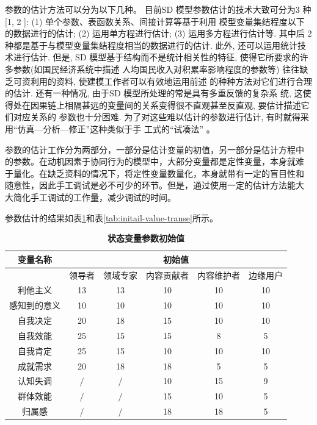 参数的估计方法可以分为以下几种。
目前SD 模型参数估计的技术大致可分为3 种[1, 2 ]: (1) 单个参数、表函数关系、间接计算等基于利用
模型变量集结程度以下的数据进行的估计; (2) 运用单方程进行估计; (3) 运用多方程进行估计等. 其中后
2 种都是基于与模型变量集结程度相当的数据进行的估计. 此外, 还可以运用统计技术进行估计.
但是, SD 模型基于结构而不是统计相关性的特征, 使得它所要求的许多参数(如国民经济系统中描述
人均国民收入对积累率影响程度的参数等) 往往缺乏可资利用的资料, 使建模工作者可以有效地运用前述
的种种方法对它们进行合理的估计. 还有一种情况, 由于SD 模型所处理的常是具有多重反馈的复杂系
统, 这使得处在因果链上相隔甚远的变量间的关系变得很不直观甚至反直观, 要估计描述它们对应关系的
参数也十分困难. 为了对这些难以估计的参数进行估计, 有时就得采用“仿真—分析—修正”这种类似于手
工式的“试凑法'' \cite{linwenhao2002}。

参数的估计工作分为两部分，一部分是估计变量的初值，另一部分是估计方程中
的参数。在动机因素于协同行为的模型中，大部分变量都是定性变量，本身就难
于量化。在缺乏资料的情况下，将定性变量数量化，本身就带有一定的盲目性和
随意性，因此手工调试是必不可少的环节。但是，通过使用一定的估计方法能大
大简化手工调试的工作量，减少调试的时间。

参数估计的结果如表\ref{tab:initail-value-level}和表\ref{tab:initail-value-transe}所示。
\begin{table}[!htbp]
  \centering
\small
  \caption{\small{\textbf{状态变量参数初始值}}}
\begin{tabular}{|c|c|c|c|c|c|}
\hline
\multicolumn{ 1}{|c|}{变量名称} &                                     \multicolumn{ 5}{|c|}{初始值} \\
\hline
\multicolumn{ 1}{|c|}{} &        领导者 &       领域专家 &      内容贡献者 &      内容维护者 &       边缘用户 \\
\hline
      利他主义 &      13      &        13    &        10    &   10         &      10      \\
\hline
    感知到的意义 &      10      &     10       &     10       &   10         &      10      \\
\hline
      自我决定 &      20      &     18       &      15      &          10  &    10        \\
\hline
      自我效能 &     25       &      15      &        15    &        8    &       5     \\
\hline
      自我肯定 &      25      &    15        &     10       &      10      &       10     \\
\hline
      成就需求 &     20       &     18       &      18      &      5      &        5    \\
\hline
      认知失调 &     $\slash$       &       $\slash$       &      10      &       15     &      9      \\
\hline
      群体效能 &     $\slash$         &          $\slash$    &    15        &      10      &       5     \\
\hline
       归属感 &       $\slash$       &     $\slash$         &      18      &        18    &        5    \\\hline
\end{tabular}  


  \label{tab:initail-value-level}
\end{table}

